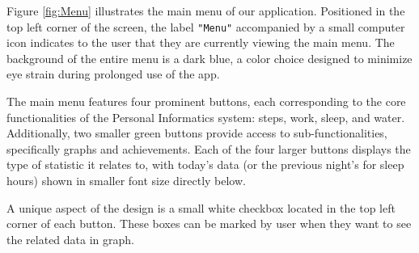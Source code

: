 \documentclass[12pt]{article}
\begin{document}
Figure \ref{fig:Menu} illustrates the main menu of our application. Positioned in the top left
corner of the screen, the label \texttt{"Menu"} accompanied by a small computer icon indicates
to the user that they are currently viewing the main menu. The background of the 
entire menu is a dark blue, a color choice designed to minimize eye strain during 
prolonged use of the app.\par

The main menu features four prominent buttons, each corresponding to the core 
functionalities of the Personal Informatics system: steps, work, sleep, and water.
Additionally, two smaller green buttons provide access to sub-functionalities, 
specifically graphs and achievements. Each of the four larger buttons displays 
the type of statistic it relates to, with today's data (or the previous night's
for sleep hours) shown in smaller font size directly below.\par

A unique aspect of the design is a small white checkbox located in the top left
corner of each button. These boxes can be marked by user when they want to see
the related data in graph.\par
\end{document}
